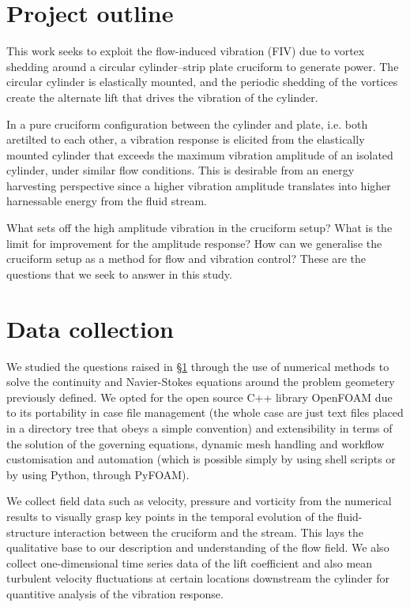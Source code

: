 \documentclass[a4paper]{article}
\begin{document}
\section{Project outline} \label{outline}
This work seeks to exploit the flow-induced vibration (FIV) due to vortex shedding around a circular cylinder--strip plate cruciform to generate power. The circular cylinder is elastically mounted, and the periodic shedding of the vortices create the alternate lift that drives the vibration of the cylinder.

In a pure cruciform configuration between the cylinder and plate, i.e. both aretilted \rfo{} to each other, a vibration response is elicited from the elastically mounted cylinder that exceeds the maximum vibration amplitude of an isolated cylinder, under similar flow conditions. This is desirable from an energy harvesting perspective since a higher vibration amplitude translates into higher harnessable energy from the fluid stream.

What sets off the high amplitude vibration in the cruciform setup? What is the limit for improvement for the amplitude response? How can we generalise the cruciform setup as a method for flow and vibration control? These are the questions that we seek to answer in this study.

\section{Data collection} \label{collection}
We studied the questions raised in \S\ref{outline} through the use of numerical methods to solve the continuity and Navier-Stokes equations around the problem geometery previously defined. We opted for the open source C++ library OpenFOAM due to its portability in case file management (the whole case are just text files placed in a directory tree that obeys a simple convention) and extensibility in terms of the solution of the governing equations, dynamic mesh handling and workflow customisation and automation (which is possible simply by using shell scripts or by using Python, through PyFOAM).

We collect field data such as velocity, pressure and vorticity from the numerical results to visually grasp key points in the temporal evolution of the fluid-structure interaction between the cruciform and the stream. This lays the qualitative base to our description and understanding of the flow field. We also collect one-dimensional time series data of the lift coefficient and also mean turbulent velocity fluctuations at certain locations downstream the cylinder for quantitive analysis of the vibration response.
\end{document}
